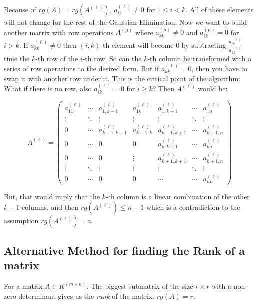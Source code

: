 Because of \(rg(A) = rg(A^{(\ell)})\), \(a^{(\ell)}_{ii} \ne 0\) for \(1 \le i < k\). All of these 
elements will not change for the rest of the Gaussian Elimination. Now we want to build another matrix 
with row operations \(A^{(\mu)}\) where \(a^{(\mu)}_{kk} \ne 0\) and \(a^{(\mu)}_{ik} = 0\) for 
\(i > k\). If \(a^{(\ell)}_{kk} \ne 0\) then \((i,k)\)-th element will become 0 by subtracting 
\(\frac{a^{(\ell)}_{ik}}{a^{(\ell)}_{kk}}\) time the \(k\)-th row of the \(i\)-th row. So can the \(k\)-th 
column be transformed with a series of row operations to the desired form. But if \(a^{(\ell)}_{kk} = 0\), 
then you have to swap it with another row under it. This is the critical point of the algorithm: What 
if there is no row, also \(a^{(\ell)}_{ik} = 0\) for \(i \ge k\)? Then \(A^{(\ell)}\) would be:

\[
	A^{(\ell)} =
	\begin{pmatrix}
	a^{(\ell)}_{11} & \cdots & a^{(\ell)}_{1,k-1} & a^{(\ell)}_{1k} & a^{(\ell)}_{1,k+1} & \cdots & a^{(\ell)}_{1n} \\
	\vdots & \ddots & \vdots & \vdots & \vdots & \ddots & \vdots \\
	0 & \cdots & a^{(\ell)}_{k-1,k-1} & a^{(\ell)}_{k-1,k} & a^{(\ell)}_{k-1,k+1} & \cdots & a^{(\ell)}_{k-1,n} \\
	0 & \cdots & 0 & 0 & a^{(\ell)}_{k,k+1} & \cdots & a^{(\ell)}_{kn} \\
	0 & \cdots & 0 & \vdots & a^{(\ell)}_{k+1,k+1} & \cdots & a^{(\ell)}_{k+1,n} \\
	\vdots & \ddots & \vdots & \vdots & \vdots & \ddots & \vdots \\
	0 & \cdots & 0 & 0 & \cdots & \cdots & a^{(\ell)}_{nn}
	\end{pmatrix}
\]

But, that would imply that the \(k\)-th column is a linear combination of the other \(k - 1\) columns, 
and then \(rg(A^{(\ell)}) \le n - 1\) which is a contradiction to the assumption  \(rg(A^{(\ell)}) = n\) 

\QED

\subsection{Alternative Method for finding the Rank of a matrix}

For a matrix \(A \in K^{(m \times n)}\). The biggest submatrix of the size \(r \times r\) with a 
non-zero determinant gives us the \emph{rank} of the matrix. \(rg(A) = r\).

